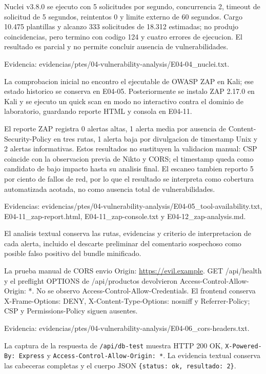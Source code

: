 Nuclei v3.8.0 se ejecuto con 5 solicitudes por segundo, concurrencia 2, timeout de solicitud de 5 segundos, reintentos 0 y limite externo de 60 segundos. Cargo 10.475 plantillas y alcanzo 333 solicitudes de 18.312 estimadas; no produjo coincidencias, pero termino con codigo 124 y cuatro errores de ejecucion. El resultado es parcial y no permite concluir ausencia de vulnerabilidades.

Evidencia: evidencias/ptes/04-vulnerability-analysis/E04-04\_nuclei.txt.

La comprobacion inicial no encontro el ejecutable de OWASP ZAP en Kali; ese estado historico se conserva en E04-05. Posteriormente se instalo ZAP 2.17.0 en Kali y se ejecuto un quick scan en modo no interactivo contra el dominio de laboratorio, guardando reporte HTML y consola en E04-11.

El reporte ZAP registra 0 alertas altas, 1 alerta media por ausencia de Content-Security-Policy en tres rutas, 1 alerta baja por divulgacion de timestamp Unix y 2 alertas informativas. Estos resultados no sustituyen la validacion manual: CSP coincide con la observacion previa de Nikto y CORS; el timestamp queda como candidato de bajo impacto hasta su analisis final. El escaneo tambien reporto 5 por ciento de fallos de red, por lo que el resultado se interpreta como cobertura automatizada acotada, no como ausencia total de vulnerabilidades.

Evidencias: evidencias/ptes/04-vulnerability-analysis/E04-05\_tool-availability.txt, E04-11\_zap-report.html, E04-11\_zap-console.txt y E04-12\_zap-analysis.md.

El analisis textual conserva las rutas, evidencias y criterio de interpretacion de cada alerta, incluido el descarte preliminar del comentario sospechoso como posible falso positivo del bundle minificado.

La prueba manual de CORS envio Origin: \href{https://evil.example}{\url{https://evil.example}}. GET /api/health y el preflight OPTIONS de /api/productos devolvieron Access-Control-Allow-Origin: *. No se observo Access-Control-Allow-Credentials. El frontend conserva X-Frame-Options: DENY, X-Content-Type-Options: nosniff y Referrer-Policy; CSP y Permissions-Policy siguen ausentes.

Evidencia: evidencias/ptes/04-vulnerability-analysis/E04-06\_cors-headers.txt.

La captura de la respuesta de \texttt{/api/db-test} muestra HTTP 200 OK, \texttt{X-Powered-By:\ Express} y \texttt{Access-Control-Allow-Origin:\ *}. La evidencia textual conserva las cabeceras completas y el cuerpo JSON \texttt{\{status: ok, resultado: 2\}}.

